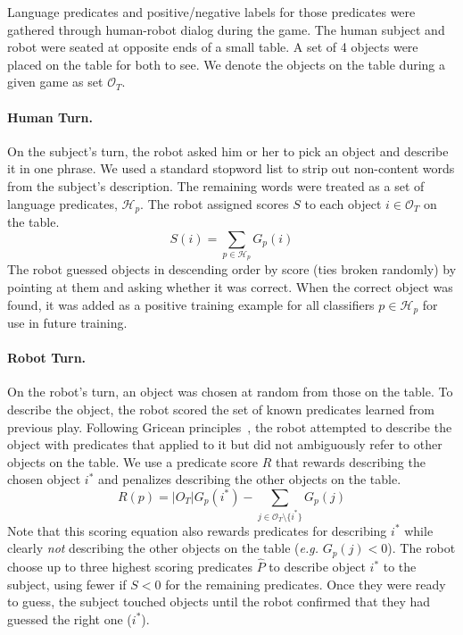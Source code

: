 Language predicates and positive/negative labels for those predicates were gathered through human-robot dialog during the \ispy game.
The human subject and robot were seated at opposite ends of a small table.
A set of 4 objects were placed on the table for both to see.
We denote the objects on the table during a given game as set $\mathcal{O}_T$.

\paragraph{Human Turn.} On the subject's turn, the robot asked him or her to pick an object and describe it in one phrase.
We used a standard stopword list to strip out non-content words from the subject's description.
The remaining words were treated as a set of language predicates, $\mathcal{H}_p$.
The robot assigned scores $S$ to each object $i\in \mathcal{O}_T$ on the table.
\begin{equation}
	S(i) = \sum_{p\in \mathcal{H}_p}{G_p(i)}
\end{equation}
The robot guessed objects in descending order by score (ties broken randomly) by pointing at them and asking whether it was correct.
When the correct object was found, it was added as a positive training example for all classifiers  $p\in \mathcal{H}_p$ for use in future training.

\paragraph{Robot Turn.} On the robot's turn, an object was chosen at random from those on the table.
To describe the object, the robot scored the set of known predicates learned from previous play.
Following Gricean principles~\cite{grice:bkchapter75}, the robot attempted to describe the object with predicates that applied to it but did not ambiguously refer to other objects on the table.
We use a predicate score $R$ that rewards describing the chosen object $i^*$ and penalizes describing the other objects on the table.
\begin{equation}
	R(p) = |O_T|G_p(i^*) - \sum_{j\in{\mathcal{O}_T}\setminus\{i^*\}}{G_p(j)}
\end{equation}
Note that this scoring equation also rewards predicates for describing $i^*$ while clearly {\it not} describing the other objects on the table (\textit{e.g.}  $G_p(j)<0$).
The robot choose up to three highest scoring predicates $\hat{P}$ to describe object $i^*$ to the subject, using fewer if $S<0$ for the remaining predicates.
Once they were ready to guess, the subject touched objects until the robot confirmed that they had guessed the right one ($i^*$).

